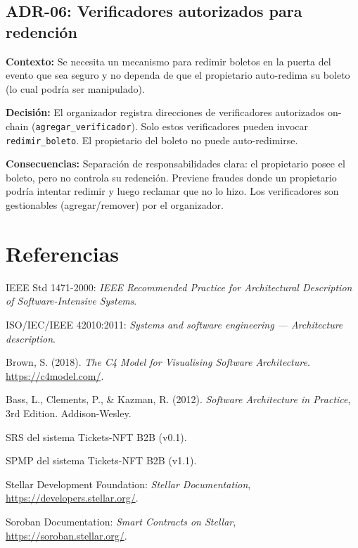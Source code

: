 \documentclass[12pt,oneside]{article}
\begin{document}
\subsection{ADR-06: Verificadores autorizados para redención}

\textbf{Contexto:} Se necesita un mecanismo para redimir boletos en la puerta del evento que sea seguro y no dependa de que el propietario auto-redima su boleto (lo cual podría ser manipulado).

\textbf{Decisión:} El organizador registra direcciones de verificadores autorizados on-chain (\texttt{agregar\_verificador}). Solo estos verificadores pueden invocar \texttt{redimir\_boleto}. El propietario del boleto no puede auto-redimirse.

\textbf{Consecuencias:} Separación de responsabilidades clara: el propietario posee el boleto, pero no controla su redención. Previene fraudes donde un propietario podría intentar redimir y luego reclamar que no lo hizo. Los verificadores son gestionables (agregar/remover) por el organizador.


\section*{Referencias}
\label{sec:referencias}

\begin{enumerate}[leftmargin=*,label={[\arabic*]}]
  \item IEEE Std 1471-2000: \textit{IEEE Recommended Practice for Architectural Description of Software-Intensive Systems}.
  \item ISO/IEC/IEEE 42010:2011: \textit{Systems and software engineering — Architecture description}.
  \item Brown, S. (2018). \textit{The C4 Model for Visualising Software Architecture}. \url{https://c4model.com/}.
  \item Bass, L., Clements, P., \& Kazman, R. (2012). \textit{Software Architecture in Practice}, 3rd Edition. Addison-Wesley.
  \item SRS del sistema Tickets-NFT B2B (v0.1).
  \item SPMP del sistema Tickets-NFT B2B (v1.1).
  \item Stellar Development Foundation: \textit{Stellar Documentation}, \url{https://developers.stellar.org/}.
  \item Soroban Documentation: \textit{Smart Contracts on Stellar}, \url{https://soroban.stellar.org/}.
\end{enumerate}
\end{document}
